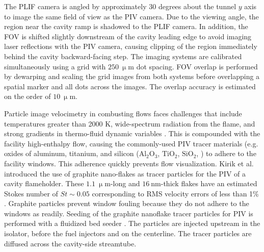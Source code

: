 The PLIF camera is angled by approximately 30 degrees about the tunnel $y$ axis to image the same field of view as the PIV camera. Due to the viewing angle, the region near the cavity ramp is shadowed to the PLIF camera. In addition, the FOV is shifted slightly downstream of the cavity leading edge to avoid imaging laser reflections with the PIV camera, causing clipping of the region immediately behind the cavity backward-facing step. The imaging systems are calibrated simultaneously using a grid with $250~ \mathrm{\upmu m}$ dot spacing. FOV overlap is performed by dewarping and scaling the grid images from both systems before overlapping a spatial marker and all dots across the images. The overlap accuracy is estimated on the order of $10~ \mathrm{\upmu m}$. 

Particle image velocimetry in combusting flows faces challenges that include temperatures greater than 2000 K, wide-spectrum radiation from the flame, and strong gradients in thermo-fluid dynamic variables \citep{StellaGujKompenhansEtAl2001}. This is compounded with the facility high-enthalpy flow, causing the commonly-used PIV tracer materials (e.g. oxides of aluminum, titanium, and silicon ($\mathrm{Al_2O_3}$, $\mathrm{TiO_2}$, $\mathrm{SiO_2}$, \citep{Melling1997, FangHong2018}) to adhere to the facility windows. This adherence quickly prevents flow visualization. 
Kirik et al. \cite{KirikGoyneMcDanielEtAl2017} introduced the use of graphite nano-flakes as tracer particles for the PIV of a cavity flameholder. These $1.1~ \mathrm{\upmu m}$-long and $16~ \mathrm{nm}$-thick flakes have an estimated Stokes number of $St\sim 0.05$ \cite{KirikGoyneMcDanielEtAl2015} corresponding to RMS velocity errors of less than 1\% \citep{SamimyLele1991}. 
Graphite particles prevent window fouling because they do not adhere to the windows as readily. 
Seeding of the graphite nanoflake tracer particles for PIV \citep{KirikGoyneMcDanielEtAl2015} is performed with a fluidized bed seeder \citep{HowisonGoyne2010}. The particles are injected upstream in the isolator, before the fuel injectors and on the centerline. The tracer particles are diffused across the cavity-side streamtube. 

